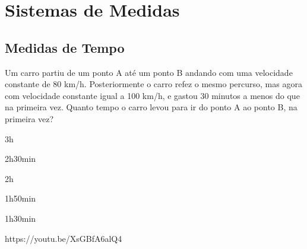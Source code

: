 \chapter{Sistemas de Medidas}

\section{Medidas de Tempo}

{Um carro partiu de um ponto A até um ponto B andando com uma velocidade constante de 80 km/h. Posteriormente o carro refez o mesmo percurso, mas agora com velocidade constante igual a 100 km/h, e gastou 30 minutos a menos do que na primeira vez. Quanto tempo o carro levou para ir do ponto A ao ponto B, na primeira vez?}
{
\item 3h
\item 2h30min
\item 2h
\item 1h50min
\item 1h30min
}
{https://youtu.be/XsGBfA6alQ4}